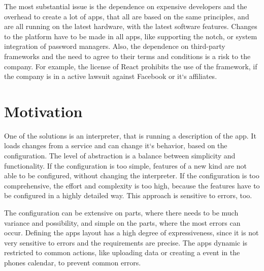 \documentclass{article}
\begin{document}

The most substantial issue is the dependence on expensive developers and the overhead to create a lot of apps, that all are based on the same principles, and are all running on the latest hardware, with the latest software features.
Changes to the platform have to be made in all apps, like supporting the notch, or system integration of password managers.
Also, the dependence on third-party frameworks and the need to agree to their terms and conditions is a risk to the company.
For example, the license of React prohibits the use of the framework, if the company is in a active lawsuit against Facebook or it`s affiliates.


\section*{Motivation}

One of the solutions is an interpreter, that is running a description of the app.
It loads changes from a service and can change it`s behavior, based on the configuration.
The level of abstraction is a balance between simplicity and functionality.
If the configuration is too simple, features of a new kind are not able to be configured, without changing the interpreter.
If the configuration is too comprehensive, the effort and complexity is too high, because the features have to be configured in a highly detailed way.
This approach is sensitive to errors, too.

The configuration can be extensive on parts, where there needs to be much variance and possibility, and simple on the parts, where the most errors can occur.
Defining the apps layout has a high degree of expressiveness, since it is not very sensitive to errors and the requirements are precise.
The apps dynamic is restricted to common actions, like uploading data or creating a event in the phones calendar, to prevent common errors.
\end{document}
